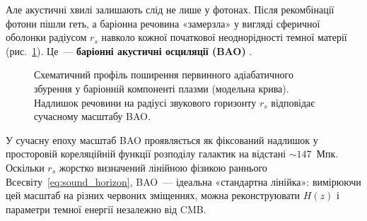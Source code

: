 \documentclass[12pt, a4paper]{article}
\begin{document}
Але акустичні хвилі залишають слід не лише у фотонах.
Після рекомбінації фотони пішли геть, а баріонна речовина
«замерзла» у вигляді сферичної оболонки радіусом $r_s$
навколо кожної початкової неоднорідності темної матерії
(рис.~\ref{fig:bao_profile}). Це~--- \textbf{баріонні
акустичні осциляції (BAO)} \cite{eisenstein_2005}.

\begin{figure}[b!]
\centering
{}
\caption{Схематичний профіль поширення первинного
  адіабатичного збурення у баріонній компоненті плазми
  (модельна крива). Надлишок речовини на радіусі
  звукового горизонту $r_s$ відповідає сучасному
  масштабу BAO.}
\label{fig:bao_profile}
\end{figure}

У сучасну епоху масштаб BAO проявляється як фіксований
надлишок у просторовій кореляційній функції розподілу
галактик на відстані $\sim 147$~Мпк. Оскільки $r_s$
жорстко визначений лінійною фізикою раннього
Всесвіту~\eqref{eq:sound_horizon}, BAO~--- ідеальна
«стандартна лінійка»: вимірюючи цей масштаб на різних
червоних зміщеннях, можна реконструювати $H(z)$ і
параметри темної енергії незалежно від CMB.
\end{document}
